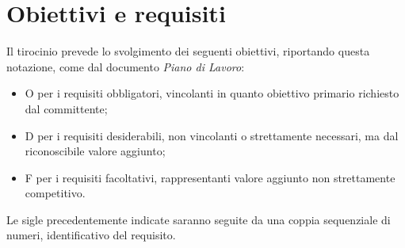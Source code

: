 \newpage

\section{Obiettivi e requisiti}

Il tirocinio prevede lo svolgimento dei seguenti obiettivi, riportando questa notazione, come dal documento \textit{Piano di Lavoro}:
\begin{itemize}
    \item O per i requisiti obbligatori, vincolanti in quanto obiettivo primario richiesto dal committente;
    \item D per i requisiti desiderabili, non vincolanti o strettamente necessari, ma dal riconoscibile valore aggiunto;
    \item F per i requisiti facoltativi, rappresentanti valore aggiunto non strettamente competitivo.
\end{itemize}
Le sigle precedentemente indicate saranno seguite da una coppia sequenziale di numeri, identificativo del requisito.

